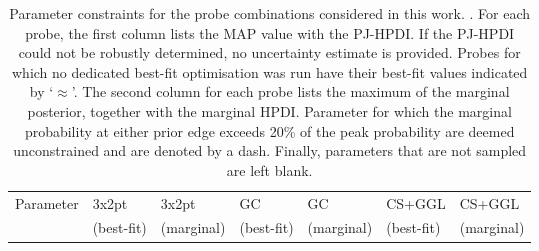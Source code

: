 \begin{landscape}
\begin{table}
\begin{center}
\caption{Parameter constraints for the probe combinations considered in this work. . 
For each probe, the first column lists the MAP value with the PJ-HPDI. 
If the PJ-HPDI could not be robustly determined, no uncertainty estimate is provided. 
Probes for which no dedicated best-fit optimisation was run have their best-fit values indicated by `$\approx$'.
The second column for each probe lists the maximum of the marginal posterior, together with the marginal HPDI. 
Parameter for which the marginal probability at either prior edge exceeds 20\% of the peak probability are deemed unconstrained and are denoted by a dash. 
Finally, parameters that are not sampled are left blank.
\label{tab:fullparams}}
\begin{tabular}{lllllll}
    \toprule
    Parameter    & 3x2pt & 3x2pt& GC & GC& CS+GGL & CS+GGL \\ 
             & (best-fit) & (marginal)& (best-fit) & (marginal)& (best-fit) & (marginal) \\ 


\end{tabular}
\end{center}
\end{table}
\end{landscape}
